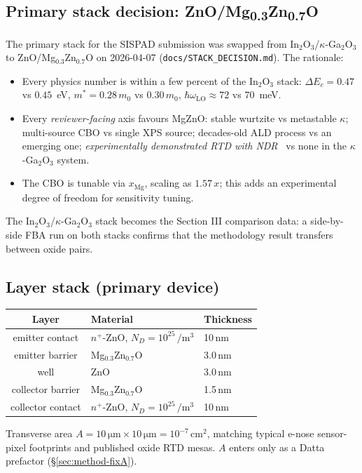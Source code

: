 \documentclass[11pt,a4paper,onecolumn]{article}
\newcommand{\code}[1]{\texttt{\small #1}}
\begin{document}
\subsection{Primary stack decision: ZnO/Mg\textsubscript{0.3}Zn\textsubscript{0.7}O}
The primary stack for the SISPAD submission was swapped from
In$_2$O$_3$/$\kappa$-Ga$_2$O$_3$ to ZnO/Mg$_{0.3}$Zn$_{0.7}$O on 2026-04-07
(\code{docs/STACK\_DECISION.md}). The rationale:
\begin{itemize}[leftmargin=1.3em,itemsep=0pt]
\item Every physics number is within a few percent of the In$_2$O$_3$
stack: $\Delta E_c = 0.47$ vs $0.45$~eV, $m^* = 0.28\,m_0$ vs $0.30\,m_0$,
$\hbar\omega_{\mathrm{LO}} \approx 72$ vs $70$~meV.
\item Every \emph{reviewer-facing} axis favours MgZnO: stable wurtzite
vs metastable $\kappa$; multi-source CBO vs single XPS source; decades-old
ALD process vs an emerging one; \emph{experimentally demonstrated RTD with
NDR}~\cite{krishnamoorthy2002} vs none in the $\kappa$-Ga$_2$O$_3$ system.
\item The CBO is tunable via $x_{\mathrm{Mg}}$, scaling as $1.57\,x$; this
adds an experimental degree of freedom for sensitivity tuning.
\end{itemize}
The In$_2$O$_3$/$\kappa$-Ga$_2$O$_3$ stack becomes the Section III
comparison data: a side-by-side FBA run on both stacks confirms that the
methodology result transfers between oxide pairs.

\subsection{Layer stack (primary device)}
\begin{center}
\small
\begin{tabular}{cll}
\toprule
Layer & Material & Thickness\\
\midrule
emitter contact & $n^+$-ZnO, $N_D = 10^{25}\,\si{\per\meter\cubed}$ & 10\,nm\\
emitter barrier & Mg$_{0.3}$Zn$_{0.7}$O & 3.0\,nm\\
well            & ZnO                   & 3.0\,nm\\
collector barrier & Mg$_{0.3}$Zn$_{0.7}$O & 1.5\,nm\\
collector contact & $n^+$-ZnO, $N_D = 10^{25}\,\si{\per\meter\cubed}$ & 10\,nm\\
\bottomrule
\end{tabular}
\end{center}
Transverse area $A = 10\,\si{\um} \times 10\,\si{\um} = 10^{-7}\,\si{\cm\squared}$,
matching typical e-nose sensor-pixel footprints and published oxide RTD
mesas. $A$ enters only as a Datta prefactor (\S\ref{sec:method-fixA}).
\end{document}
